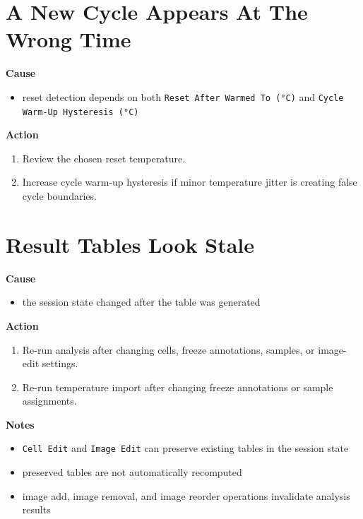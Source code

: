 \documentclass[
  9pt,
  letterpaper,
  oneside,
  open=any,
  DIV=15,
  parskip=half-,
  headings=big,
  numbers=noenddot
]{scrbook}
\newcommand{\manuallead}[1]{%
  \vspace{0.15em}%
  {\sffamily\bfseries\color{ManualBlue}#1}\par\nobreak\vspace{0.05em}%
}
\begin{document}
\section{A New Cycle Appears At The Wrong Time}

\manuallead{Cause}

\begin{itemize}[leftmargin=*,itemsep=0.35em,topsep=0.4em]
\item reset detection depends on both \texttt{Reset After Warmed To (°C)} and \texttt{Cycle Warm-Up Hysteresis (°C)}
\end{itemize}

\manuallead{Action}

\begin{enumerate}[leftmargin=*,itemsep=0.35em,topsep=0.4em]
\item Review the chosen reset temperature.
\item Increase cycle warm-up hysteresis if minor temperature jitter is creating false cycle boundaries.
\end{enumerate}

\section{Result Tables Look Stale}

\manuallead{Cause}

\begin{itemize}[leftmargin=*,itemsep=0.35em,topsep=0.4em]
\item the session state changed after the table was generated
\end{itemize}

\manuallead{Action}

\begin{enumerate}[leftmargin=*,itemsep=0.35em,topsep=0.4em]
\item Re-run analysis after changing cells, freeze annotations, samples, or image-edit settings.
\item Re-run temperature import after changing freeze annotations or sample assignments.
\end{enumerate}

\manuallead{Notes}

\begin{itemize}[leftmargin=*,itemsep=0.35em,topsep=0.4em]
\item \texttt{Cell Edit} and \texttt{Image Edit} can preserve existing tables in the session state
\item preserved tables are not automatically recomputed
\item image add, image removal, and image reorder operations invalidate analysis results
\end{itemize}
\end{document}
